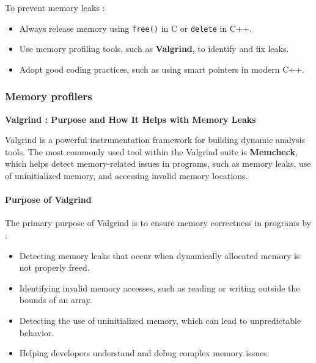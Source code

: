 \documentclass[12pt]{article}
\begin{document}
            To prevent memory leaks :
            \begin{itemize}
                \item Always release memory using \texttt{free()} in C or \texttt{delete} in C++.
                \item Use memory profiling tools, such as \textbf{Valgrind}, to identify and fix leaks.
                \item Adopt good coding practices, such as using smart pointers in modern C++.
            \end{itemize}




        \subsubsection{Memory profilers}

            \textbf{Valgrind : Purpose and How It Helps with Memory Leaks}
            
            Valgrind is a powerful instrumentation framework for building dynamic analysis tools. The most commonly used tool within the Valgrind suite is \textbf{Memcheck}, which helps detect memory-related issues in programs, such as memory leaks, use of uninitialized memory, and accessing invalid memory locations.
            
            \paragraph{Purpose of Valgrind}
            The primary purpose of Valgrind is to ensure memory correctness in programs by :
            \begin{itemize}
                \item Detecting memory leaks that occur when dynamically allocated memory is not properly freed.
                \item Identifying invalid memory accesses, such as reading or writing outside the bounds of an array.
                \item Detecting the use of uninitialized memory, which can lead to unpredictable behavior.
                \item Helping developers understand and debug complex memory issues.
            \end{itemize}
            
\end{document}
